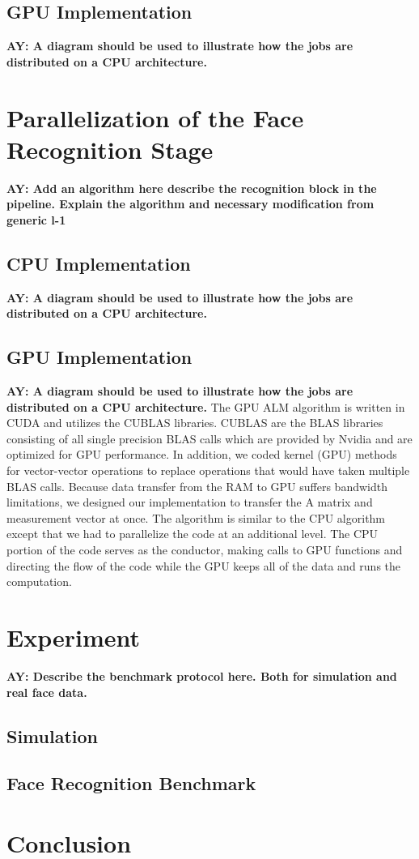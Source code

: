 \documentclass[10pt,twocolumn,letterpaper]{article}
\begin{document}
\subsection{GPU Implementation}
{\bf AY: A diagram should be used to illustrate how the jobs are distributed on a CPU architecture.}

\section{Parallelization of the Face Recognition Stage}
\label{sec:recognition}
{\bf AY: Add an algorithm here describe the recognition block in the pipeline. Explain the algorithm and necessary modification from generic l-1}

\subsection{CPU Implementation}
{\bf AY: A diagram should be used to illustrate how the jobs are distributed on a CPU architecture.}

\subsection{GPU Implementation}
{\bf AY: A diagram should be used to illustrate how the jobs are distributed on a CPU architecture.}
The GPU ALM algorithm is written in CUDA and utilizes the CUBLAS libraries.
CUBLAS are the BLAS libraries consisting of all single precision BLAS calls
which are provided by Nvidia and are optimized for GPU performance. In
addition, we coded kernel (GPU) methods for vector-vector operations to replace
operations that would have taken multiple BLAS calls. Because data transfer from the RAM to GPU suffers bandwidth limitations, we designed our implementation to transfer the A matrix and measurement vector at once.  The algorithm is similar
to the CPU algorithm except that we had to parallelize the code at an
additional level. The CPU portion of the code serves as the conductor, making
calls to GPU functions and directing the flow of the code while the GPU keeps all of the data and runs the computation.

\section{Experiment}
{\bf AY: Describe the benchmark protocol here. Both for simulation and real face data.}

\subsection{Simulation}

\subsection{Face Recognition Benchmark}

\section{Conclusion}

{\small


}
\end{document}
